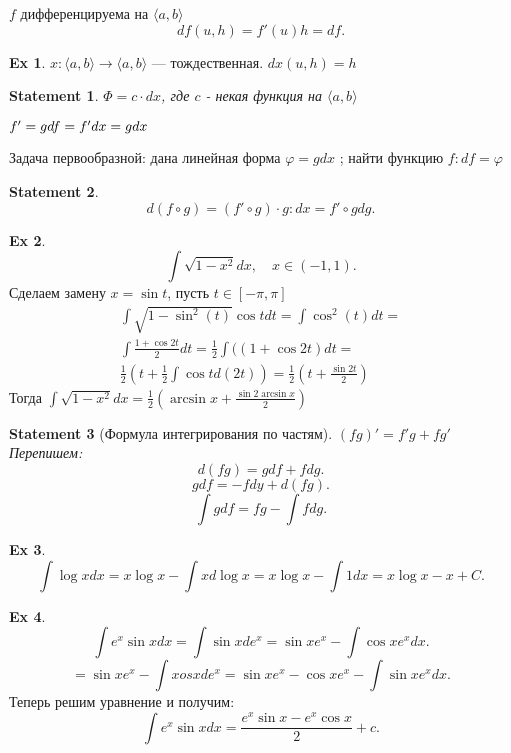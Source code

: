 \documentclass[11pt]{book}
\theoremstyle{definition}
\theoremstyle{plain}
\theoremstyle{plain}
\newtheorem*{st}{Statement}
\theoremstyle{definition}
\newtheorem*{ex}{Ex}
\theoremstyle{remark}
\begin{document}
\begin{defn}[дифференциал]
    $ f $   дифференцируема на $ \langle a, b \rangle$
    \[
	df(u, h) = f'(u) h = df
    .\]
\end{defn}
\begin{ex}
    $ x: \langle a, b \rangle \to  \langle a, b \rangle$ --- тождественная. $ dx (u, h)= h$
\end{ex}
\begin{st}
    $ \Phi = c \cdot dx$, где  $ c$ - некая функция на $ \langle a, b \rangle$
\end{st}
$ f' = g \\
df = f' dx = g dx$

Задача первообразной: дана линейная форма $ \varphi = g dx$ ; найти функцию $ f: df = \varphi $
\begin{st}
    \[
	d(f \circ g) = (f' \circ g) \cdot g: dx = f' \circ g dg
    .\]
\end{st}
\begin{ex}
    \[
	\int \sqrt{1 - x^2} dx, \quad x \in  (-1, 1)
    .\]
    Сделаем замену $ x = \sin t$, пусть $ t \in  [- \pi , \pi]$
    $$
    \begin{array}{c}
	\int \sqrt{1-\sin^2(t)} \cos t dt = \int \cos^2(t) dt =\\
	\int \frac{1 + \cos 2t}{2} dt = \frac{1}{2} \int ((1 + \cos 2t) dt = \\
	\frac{1}{2}(t + \frac{1}{2} \int \cos t d(2t)) = \frac{1}{2} (t + \frac{\sin
	2 t}{2})
    \end{array}
    $$
    Тогда $ \int \sqrt{1 - x^2} dx = \frac{1}{2} (\arcsin x + \frac{\sin 2 \arcsin x}{2})$
\end{ex}
\begin{st}[Формула интегрирования по частям]

    $ (fg)' = f'g + fg'$
    Перепишем:
    \[
	d(fg) = g df + f dg
    .\]
    \[
	g df = -f dy + d(fg)
    .\]
    \[
	\int g df = fg - \int f dg
    .\]
\end{st}
\begin{ex}
    \[
	\int \log x dx = x \log x - \int x d \log x = x \log x - \int 1 dx = x \log x -x + C
    .\]
\end{ex}
\begin{ex}
    \[
	\int e^{x} \sin x dx = \int \sin x d e^{x} = \sin x e^{ x} - \int \cos x e^{x} dx
    .\]
    \[
	= \sin x e^{x} - \int xos x d e^{x} = \sin x e^{x} - \cos x e^{ x} - \int \sin x e ^{x} dx
    .\]
    Теперь решим уравнение и получим:
    \[
	\int e^{x} \sin x dx = \frac{e^{x} \sin x - e^{x} \cos x}{2} + c
    .\]
\end{ex}
\end{document}
